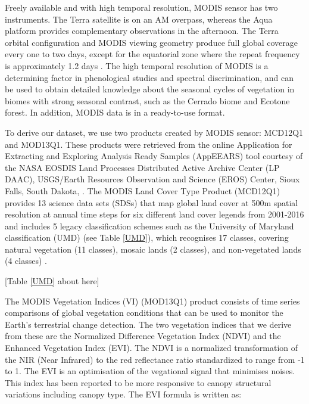 
Freely available and with high temporal resolution, MODIS sensor has two instruments. The Terra satellite is on an AM overpass, whereas the Aqua platform provides complementary observations in the afternoon. The Terra orbital configuration and MODIS viewing geometry produce full global coverage every one to two days, except for the equatorial zone where the repeat frequency is approximately 1.2 days \citep{zhan_2002, setiawan_2014}. The high temporal resolution of MODIS is a determining factor in phenological studies and spectral discrimination, and can be used to obtain detailed knowledge about the seasonal cycles of vegetation in biomes with strong seasonal contrast, such as the Cerrado biome and Ecotone forest. In addition, MODIS data is in a ready-to-use format.

To derive our dataset, we use two products created by MODIS sensor: MCD12Q1 and MOD13Q1. These products were retrieved from the online Application for Extracting and Exploring Analysis Ready Samples (AppEEARS) tool courtesy of the NASA EOSDIS Land Processes Distributed Active Archive Center (LP DAAC), USGS/Earth Resources Observation and Science (EROS) Center, Sioux Falls, South Dakota, \citep{didan_2015,didan_munoz_2015,sulla_2015,sulla2_2018}. The MODIS Land Cover Type Product (MCD12Q1) provides 13 science data sets (SDSs) that map global land cover at 500m spatial resolution at annual time steps for six different land cover legends from 2001-2016 and includes 5 legacy classification schemes such as the University of Maryland classification (UMD) (see Table \ref{UMD}), which recognises 17 classes, covering natural vegetation (11 classes), mosaic lands (2 classes), and non-vegetated lands (4 classes) \citep{setiawan_2014, friedl_2018}. 

[Table \ref{UMD} about here]

The MODIS Vegetation Indices (VI) (MOD13Q1) product consists of time series comparisons of global vegetation conditions that can be used to monitor the Earth's terrestrial change detection. The two vegetation indices that we derive from these are the Normalized Difference Vegetation Index (NDVI) and the Enhanced Vegetation Index (EVI). The NDVI is a normalized transformation of the NIR (Near Infrared) to the red reflectance ratio standardized to range from -1 to 1. The EVI is an optimisation of the vegational signal that minimises noises. This index has been reported to be more responsive to canopy structural variations including canopy type. The EVI formula is written as: 



